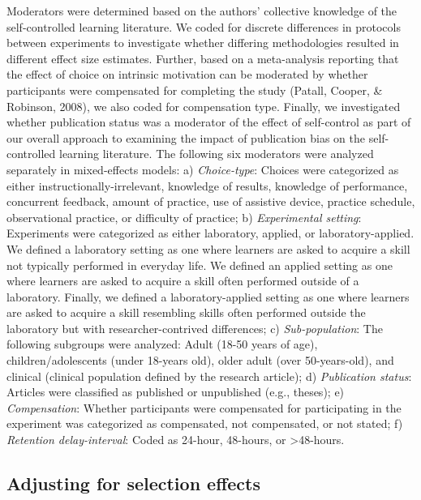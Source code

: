 \documentclass[
  english,
  man, donotrepeattitle,floatsintext]{apa7}
\begin{document}
Moderators were determined based on the authors' collective knowledge of the self-controlled learning literature. We coded for discrete differences in protocols between experiments to investigate whether differing methodologies resulted in different effect size estimates. Further, based on a meta-analysis reporting that the effect of choice on intrinsic motivation can be moderated by whether participants were compensated for completing the study (Patall, Cooper, \& Robinson, 2008), we also coded for compensation type. Finally, we investigated whether publication status was a moderator of the effect of self-control as part of our overall approach to examining the impact of publication bias on the self-controlled learning literature. The following six moderators were analyzed separately in mixed-effects models: a) \emph{Choice-type}: Choices were categorized as either instructionally-irrelevant, knowledge of results, knowledge of performance, concurrent feedback, amount of practice, use of assistive device, practice schedule, observational practice, or difficulty of practice; b) \emph{Experimental setting}: Experiments were categorized as either laboratory, applied, or laboratory-applied. We defined a laboratory setting as one where learners are asked to acquire a skill not typically performed in everyday life. We defined an applied setting as one where learners are asked to acquire a skill often performed outside of a laboratory. Finally, we defined a laboratory-applied setting as one where learners are asked to acquire a skill resembling skills often performed outside the laboratory but with researcher-contrived differences; c) \emph{Sub-population}: The following subgroups were analyzed: Adult (18-50 years of age), children/adolescents (under 18-years old), older adult (over 50-years-old), and clinical (clinical population defined by the research article); d) \emph{Publication status}: Articles were classified as published or unpublished (e.g., theses); e) \emph{Compensation}: Whether participants were compensated for participating in the experiment was categorized as compensated, not compensated, or not stated; f) \emph{Retention delay-interval}: Coded as 24-hour, 48-hours, or \textgreater48-hours.

\hypertarget{adjusting-for-selection-effects}{%
\subsection{Adjusting for selection effects}\label{adjusting-for-selection-effects}}
\end{document}

